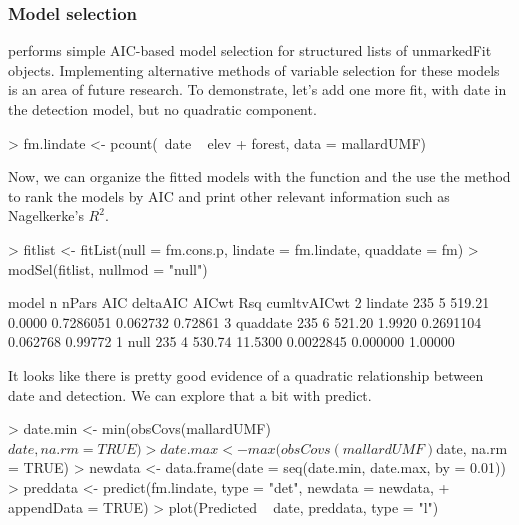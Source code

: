 \documentclass[article,shortnames]{jss}
\begin{document}
\subsubsection{Model selection}

 performs simple AIC-based model selection for
structured lists of unmarkedFit objects.  %
Implementing alternative methods of
variable selection for these models is an area of future research.
To demonstrate, let's add one more fit, with date in the detection model,
but no quadratic component.

\begin{Schunk}
\begin{Sinput}
> fm.lindate <- pcount(~date ~ elev + forest, data = mallardUMF)
\end{Sinput}
\end{Schunk}

Now, we can organize the fitted models with the  function and
the use the  method to rank the models by AIC and print
other relevant information such as Nagelkerke's
\citeyearpar{Nagelkerke1991} $R^{2}$.

\begin{Schunk}
\begin{Sinput}
> fitlist <- fitList(null = fm.cons.p, lindate = fm.lindate, quaddate = fm)
> modSel(fitlist, nullmod = "null")
\end{Sinput}
\begin{Soutput}
     model   n nPars    AIC deltaAIC     AICwt      Rsq cumltvAICwt
2  lindate 235     5 519.21   0.0000 0.7286051 0.062732     0.72861
3 quaddate 235     6 521.20   1.9920 0.2691104 0.062768     0.99772
1     null 235     4 530.74  11.5300 0.0022845 0.000000     1.00000
\end{Soutput}
\end{Schunk}
It looks like there is pretty good evidence of a quadratic
relationship between date and detection.  We can explore that a bit
with predict.

\begin{Schunk}
\begin{Sinput}
> date.min <- min(obsCovs(mallardUMF)$date, na.rm = TRUE)
> date.max <- max(obsCovs(mallardUMF)$date, na.rm = TRUE)
> newdata <- data.frame(date = seq(date.min, date.max, by = 0.01))
> preddata <- predict(fm.lindate, type = "det", newdata = newdata, 
+     appendData = TRUE)
> plot(Predicted ~ date, preddata, type = "l")
\end{Sinput}
\end{Schunk}
\end{document}
